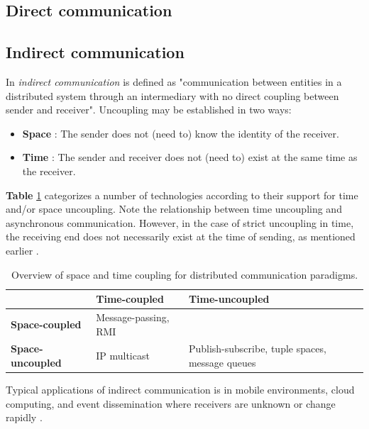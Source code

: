 \subsection{Direct communication}





\subsection{Indirect communication}

In \cite{Coulouris:2011:DSC:2029110} \emph{indirect communication} is defined as "communication between entities in a distributed system through an intermediary with no direct coupling between sender and receiver". Uncoupling may be established in two ways:

\begin{itemize}
	\item \textbf{Space} : The sender does not (need to) know the identity of the receiver.
	\item \textbf{Time} : The sender and receiver does not (need to) exist at the same time as the receiver.
\end{itemize}

\textbf{Table} \ref{tab:indirectcommunication-uncoupling} categorizes a number of technologies according to their support for time and/or space uncoupling. Note the relationship between time uncoupling and asynchronous communication. However, in the case of strict uncoupling in time, the receiving end does not necessarily exist at the time of sending, as mentioned earlier \cite{Coulouris:2011:DSC:2029110}.


\begin{table}[h]
	\caption{Overview of space and time coupling for distributed communication paradigms.}
	\label{tab:indirectcommunication-uncoupling}
	\begin{tabular}{p{100px} | p{125px} | p{125px}}
															& \textbf{Time-coupled} 	& \textbf{Time-uncoupled} \\
		\hline
		\textbf{Space-coupled} 		& Message-passing, RMI 		&  \\
		\textbf{Space-uncoupled} 	& IP multicast						& Publish-subscribe, tuple spaces, message queues \\
		\hline
	\end{tabular}
\end{table}

Typical applications of indirect communication is in mobile environments, cloud computing, and event dissemination where receivers are unknown or change rapidly \cite{Coulouris:2011:DSC:2029110}.

